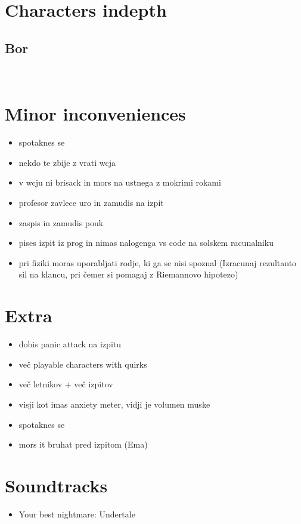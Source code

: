 \documentclass[a4paper]{article}
\begin{document}
\section{Characters indepth}
\subsection*{Bor}
\

\section{Minor inconveniences}
\begin{itemize}
    \item spotaknes se
    \item nekdo te zbije z vrati wcja
    \item v wcju ni brisack in mors na ustnega z mokrimi rokami
    \item profesor zavlece uro in zamudis na izpit
    \item zaspis in zamudis pouk
    \item pises izpit iz prog in nimas nalogenga vs code na solskem racunalniku
    \item pri fiziki moras uporabljati rodje, ki ga se nisi spoznal (Izracunaj rezultanto sil na klancu, pri čemer si pomagaj z Riemannovo hipotezo)
\end{itemize}

\section{Extra}
\begin{itemize}
    \item dobis panic attack na izpitu
    \item več playable characters with quirks
    \item več letnikov + več izpitov
    \item visji kot imas anxiety meter, vidji je volumen muske
    \item spotaknes se
    \item mors it bruhat pred izpitom (Ema)
\end{itemize}

\section{Soundtracks}
\begin{itemize}
    \item Your best nightmare: Undertale
\end{itemize}
\end{document}
